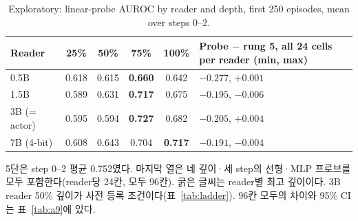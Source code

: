 \begin{table}[htbp]
\centering\small
\caption{Exploratory: linear-probe AUROC by reader and depth, first 250 episodes, mean over steps 0--2.}\label{tab:a6}
\begin{tabularx}{\linewidth}{@{}lccccL@{}}
\toprule
Reader & 25\% & 50\% & 75\% & 100\% & Probe $-$ rung 5, all 24 cells per reader (min, max) \\
\midrule
0.5B & 0.618 & 0.615 & \textbf{0.660} & 0.642 & $-0.277$, $+0.001$ \\
1.5B & 0.589 & 0.631 & \textbf{0.717} & 0.675 & $-0.195$, $-0.006$ \\
3B (= actor) & 0.595 & 0.594 & \textbf{0.727} & 0.682 & $-0.205$, $+0.004$ \\
7B (4-bit) & 0.608 & 0.643 & 0.704 & \textbf{0.717} & $-0.191$, $-0.004$ \\
\bottomrule
\end{tabularx}
\par\smallskip\raggedright\footnotesize
5단은 step 0--2 평균 0.752였다. 마지막 열은 네 깊이·세 step의 선형·MLP 프로브를 모두 포함한다(reader당 24칸, 모두 96칸). 굵은 글씨는 reader별 최고 깊이이다. 3B reader 50\% 깊이가 사전 등록 조건이다(표~\ref{tab:ladder}). 96칸 모두의 차이와 95\% CI는 표~\ref{tab:a9}에 있다.
\end{table}
